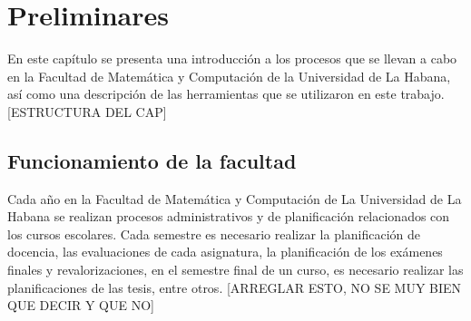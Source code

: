 \chapter{Preliminares}\label{chapter:preliminaries}
En este capítulo se presenta una introducción a los procesos que se llevan a cabo en la Facultad
de Matemática y Computación de la Universidad de La Habana, así
como una descripción de las herramientas que se utilizaron 
en este trabajo. \\

[ESTRUCTURA DEL CAP] \\



\section{Funcionamiento de la facultad}\label{section:funcionamiento de la facultad}


Cada año en la Facultad de Matemática y Computación de La 
Universidad de La Habana se realizan procesos administrativos y de 
planificación relacionados con los cursos escolares.
Cada semestre es necesario realizar la planificación de docencia,
las evaluaciones de cada asignatura, la planificación de los 
exámenes finales y revalorizaciones, en el semestre final de un 
curso, es necesario realizar las planificaciones de las tesis, entre otros.
[ARREGLAR ESTO, NO SE MUY BIEN QUE DECIR Y QUE NO]






